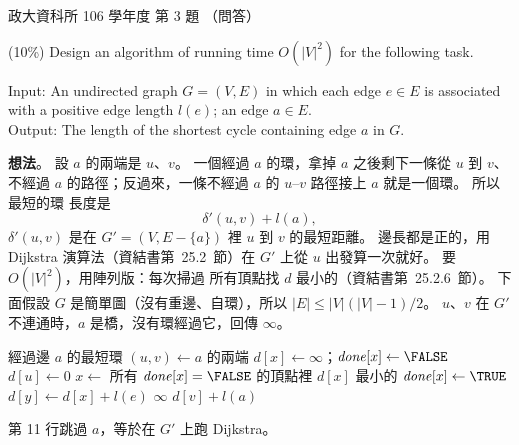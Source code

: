 \begin{pastexam}[label={px:nccu-106-dsa-03}]{政大資科所 106 學年度 第 3 題}
（問答）

(10\%) Design an algorithm of running time $O(|V|^2)$ for the following task.

\hspace*{1.5em}Input: An undirected graph $G=(V,E)$ in which each edge $e\in E$ is associated
with a positive edge length $l(e)$; an edge $a\in E$.\\
\hspace*{1.5em}Output: The length of the shortest cycle containing edge $a$ in $G$.
\end{pastexam}

\begin{pastsoln}
\textbf{想法}。 設 $a$ 的兩端是 $u$、$v$。 一個經過 $a$ 的環，拿掉 $a$ 之後剩下一條從 $u$ 到 $v$、
不經過 $a$ 的路徑；反過來，一條不經過 $a$ 的 $u$--$v$ 路徑接上 $a$ 就是一個環。 所以最短的環
長度是
\[
\delta'(u, v) + l(a),
\]
$\delta'(u, v)$ 是在 $G' = (V, E - \{a\})$ 裡 $u$ 到 $v$ 的最短距離。 邊長都是正的，用 Dijkstra
演算法（資結書第~25.2~節）在 $G'$ 上從 $u$ 出發算一次就好。 要 $O(|V|^2)$，用陣列版：每次掃過
所有頂點找 $d$ 最小的（資結書第~25.2.6~節）。 下面假設 $G$ 是簡單圖（沒有重邊、自環），所以
$|E| \le |V|(|V|-1)/2$。 $u$、$v$ 在 $G'$ 不連通時，$a$ 是橋，沒有環經過它，回傳 $\infty$。

\begin{pseudo}{經過邊 $a$ 的最短環}
    \State $(u, v) \gets a$ 的兩端
        \State $d[x] \gets \infty$；$\mathit{done}[x] \gets \FALSE$
    \EndFor
    \State $d[u] \gets 0$
        \State $x \gets$ 所有 $\mathit{done}[x] = \FALSE$ 的頂點裡 $d[x]$ 最小的 
            \State \Break {}
        \EndIf
        \State $\mathit{done}[x] \gets \TRUE$
                \State $d[y] \gets d[x] + l(e)$
            \EndIf
        \EndFor
    \EndFor
        \State \Return $\infty$ 
    \EndIf
    \State \Return $d[v] + l(a)$
\EndFunction
\end{pseudo}

第 11 行跳過 $a$，等於在 $G'$ 上跑 Dijkstra。


\end{pastsoln}
